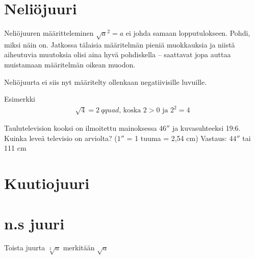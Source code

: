 \begin{esimerkki}
\begin{eguation}
{{\section{Neliöjuuri}


Neliöjuuren määritteleminen $\sqrt{a}^2=a$ ei johda samaan lopputulokseen. Pohdi, miksi näin on.
Jatkossa tälaisia määritelmän pieniä muokkauksia ja niistä aiheutuvia muutoksia olisi aina hyvä pohdiskella -- saattavat jopa auttaa muistamaan määritelmän oikean muodon.

Neliöjuurta ei siis nyt määritelty ollenkaan negatiivisille luvuille.


Esimerkki
\begin{align*}
\sqrt{4} = 2\ qquad\textrm{, koska $2>0$ ja $2^2 =4$} 
\end{align*}

Taulutelevision kooksi on ilmoitettu mainoksessa $46''$ ja kuvasuhteeksi 19:6. Kuinka leveä televisio on arviolta? ($1''$ = 1 tuuma = 2,54 cm)
Vastaus: $44''$ tai 111 cm

\section{Kuutiojuuri}


\section{n.s juuri}
Toista juurta $\sqrt[2]{a}$ merkitään $\sqrt{a}$



}}
\end{eguation}
\end{esimerkki}
